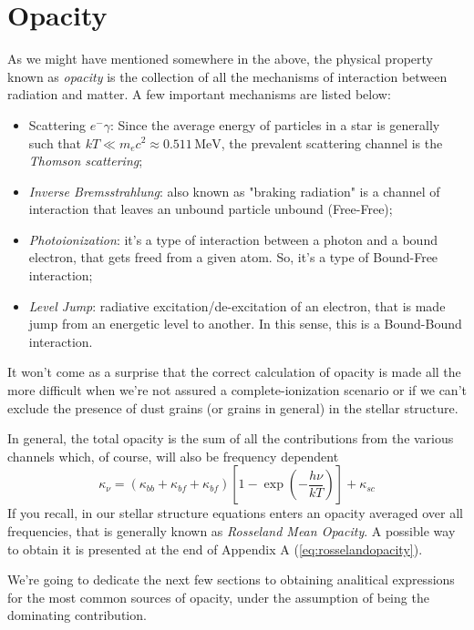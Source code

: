 \section{Opacity}
As we might have mentioned somewhere in the above, the physical property known as \emph{opacity} is the collection of all the mechanisms of interaction between radiation and matter. A few important mechanisms are listed below:
\begin{itemize}
	\item Scattering $e^{-}\gamma$: Since the average energy of particles in a star is generally such that $kT \ll m_{e}c^{2}\approx 0.511\,\text{MeV}$, the prevalent scattering channel is the \emph{Thomson scattering};
	\item \emph{Inverse Bremsstrahlung}: also known as "braking radiation" is a channel of interaction that leaves an unbound particle unbound (Free-Free);
	\item \emph{Photoionization}: it's a type of interaction between a photon and a bound electron, that gets freed from a given atom. So, it's a type of Bound-Free interaction;
	\item \emph{Level Jump}: radiative excitation/de-excitation of an electron, that is made jump from an energetic level to another. In this sense, this is a Bound-Bound interaction.
\end{itemize}
It won't come as a surprise that the correct calculation of opacity is made all the more difficult when we're not assured a complete-ionization scenario or if we can't exclude the presence of dust grains (or grains in general) in the stellar structure.
\par In general, the total opacity is the sum of all the contributions from the various channels which, of course, will also be frequency dependent
\begin{equation}
	\kappa_{\nu} = (\kappa_{bb}+\kappa_{bf}+\kappa_{bf})\left[1-\exp\left(-\frac{h\nu}{kT}\right)\right]+\kappa_{sc}
	\label{eq:totalopacity}
\end{equation}
If you recall, in our stellar structure equations enters an opacity averaged over all frequencies, that is generally known as \emph{Rosseland Mean Opacity}. A possible way to obtain it is presented at the end of Appendix A (\ref{eq:rosselandopacity}).
\par We're going to dedicate the next few sections to obtaining analitical expressions for the most common sources of opacity, under the assumption of being the dominating contribution.


